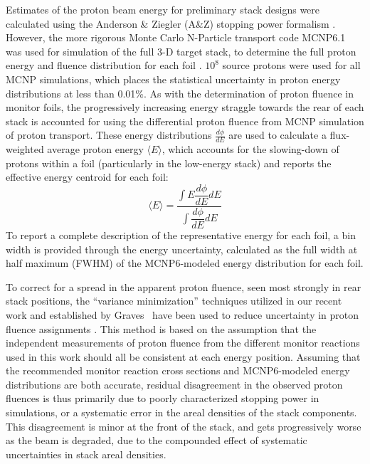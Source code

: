 Estimates of the proton beam energy for preliminary stack designs were calculated using the Anderson \& Ziegler (A\&Z) stopping power formalism \cite{Andersen_Ziegler_1977,Ziegler1985,Ziegler1999}.
However, the more rigorous Monte Carlo N-Particle transport code MCNP6.1 was used for simulation of the full 3-D target stack, to determine the full proton energy and fluence distribution for each foil   \cite{Goorley2012}. 
$10^8$ source protons were used for all MCNP simulations, which places the statistical uncertainty in proton energy distributions at less than 0.01\%.
As with the determination of proton fluence in monitor foils, the progressively increasing energy straggle towards the rear of each stack is accounted for using the differential proton fluence from MCNP simulation of proton transport.
These energy distributions $\frac{d\phi}{dE}$ are used to calculate a flux-weighted average proton  energy $\langle E \rangle$, which accounts for the slowing-down of protons within a foil (particularly in the low-energy stack) and reports the effective  energy centroid for each foil:
\begin{equation}
\langle E \rangle = \dfrac{{\displaystyle\int E \dfrac{d\phi}{dE} dE}}{{\displaystyle\int \dfrac{d\phi}{dE} dE}}
\end{equation}
To report a complete description of the representative energy for each foil, a bin width is provided through the  energy uncertainty, calculated as the full width at half maximum (FWHM) of the MCNP6-modeled energy distribution for each foil.


To correct for a spread in the apparent proton fluence, seen most strongly in rear stack positions, the \enquote{variance minimization} techniques utilized in our recent work and established by Graves \etal\ have been used to reduce uncertainty in proton fluence assignments \cite{Voyles2018a,Graves2016}.
This method is based on the assumption that the independent measurements of proton fluence from the different monitor reactions used in this work should all be consistent at each energy position.
Assuming that the recommended monitor reaction cross sections and MCNP6-modeled energy distributions are both accurate, residual disagreement in the  observed proton fluences is thus primarily due to poorly characterized stopping power in simulations, or a systematic error in the 
areal densities of the stack components. 
This disagreement is minor at the front of the stack, and gets progressively worse as the beam is degraded, due to the compounded effect of systematic uncertainties in stack areal densities.



